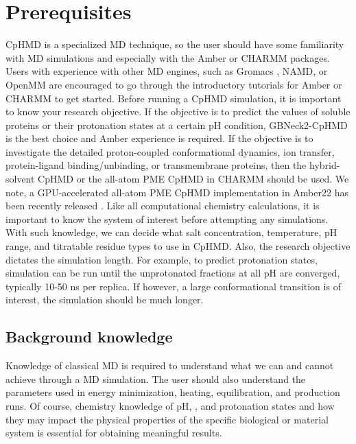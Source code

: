 \section{Prerequisites} %
CpHMD is a specialized MD technique, so the user should have some familiarity with MD simulations and especially with the Amber or CHARMM packages. 
Users with experience with other MD engines, such as Gromacs
\cite{Abraham_Lindahl_2015_SoftwareX}, NAMD\cite{Phillips_Tajkhorshid_2020_J.Chem.Phys.}, 
or OpenMM
\cite{Eastman_Pande_2017_PLoSComput.Biol.} 
are encouraged to go through the introductory tutorials for Amber or CHARMM to get started. 
Before running a CpHMD simulation, it is important to know your research objective. 
If the objective is to predict the {\pka} values of soluble proteins or their protonation states at a certain pH condition, GBNeck2-CpHMD 
\cite{Huang_Shen_2018_J.Chem.Inf.Model.,Harris_Shen_2019_J.Chem.Inf.Model.}
is the best choice and Amber \cite{Case_Kollman_2018}
experience is required. 
If the objective is to investigate the detailed proton-coupled conformational dynamics, ion transfer, protein-ligand binding/unbinding,
or transmembrane proteins, then 
the hybrid-solvent CpHMD  \cite{Wallace_Shen_2011_J.Chem.TheoryComput.,Huang_Shen_2016_Nat.Commun.} 
or the all-atom PME CpHMD \cite{Huang_Shen_2016_J.Chem.TheoryComput.}
in CHARMM
\cite{Brooks_Karplus_2009_J.Comput.Chem.}
should be used.
We note, a GPU-accelerated all-atom PME CpHMD 
implementation in Amber22 \cite{Case_Kollman_2022}
has been recently released \cite{Harris_Shen_Submitted}.
Like all computational chemistry calculations, it is important to know the system of interest
before attempting any simulations. 
With such knowledge, we can decide what salt concentration, temperature, pH range, and titratable residue types to use in CpHMD. Also, the research objective dictates the simulation length. For example, to predict protonation states, simulation can be run until the unprotonated fractions at all pH are converged, typically 10-50 ns per replica. If however, a large conformational transition is of interest, the simulation should be much longer. 

\subsection{Background knowledge}
Knowledge of classical MD is required to understand what we can and cannot achieve through a MD simulation. 
The user should also understand the parameters used in energy minimization, heating, equilibration, and production runs. 
Of course, chemistry knowledge of pH, {\pka}, and protonation states and how they may impact the physical properties of the specific biological or material system is essential for obtaining meaningful results.

